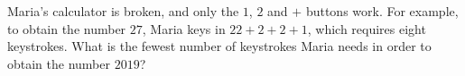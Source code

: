 Maria's calculator is broken, and only the $1$, $2$ and $+$ buttons work. For example, to obtain the number $27$, Maria keys in $22+2+2+1$, which requires eight keystrokes. What is the fewest number of keystrokes Maria needs in order to obtain the number $2019$?
